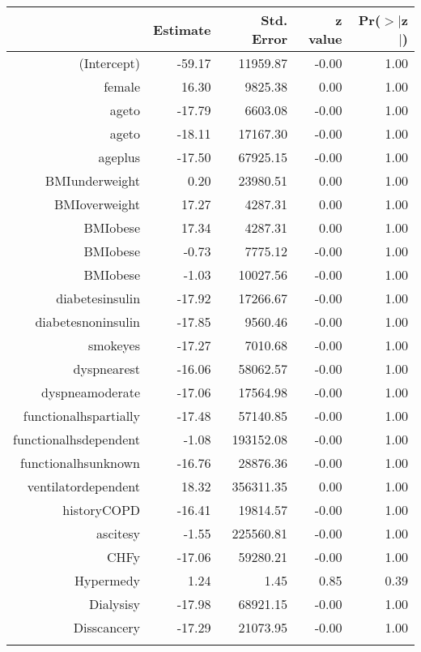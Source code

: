 \bigskip\bigskip
\centering
\begin{tabular}{rrrrr}
  \hline
 & Estimate & Std. Error & z value & Pr($>$$|$z$|$) \\ 
  \hline
(Intercept) & -59.17 & 11959.87 & -0.00 & 1.00 \\ 
  female & 16.30 & 9825.38 & 0.00 & 1.00 \\ 
  age\-65\-to\-74 & -17.79 & 6603.08 & -0.00 & 1.00 \\ 
  age\-75\-to\-84 & -18.11 & 17167.30 & -0.00 & 1.00 \\ 
  age\-85\-plus & -17.50 & 67925.15 & -0.00 & 1.00 \\ 
  BMI\-underweight & 0.20 & 23980.51 & 0.00 & 1.00 \\ 
  BMI\-overweight & 17.27 & 4287.31 & 0.00 & 1.00 \\ 
  BMI\-obese\-1 & 17.34 & 4287.31 & 0.00 & 1.00 \\ 
  BMI\-obese\-2 & -0.73 & 7775.12 & -0.00 & 1.00 \\ 
  BMI\-obese\-3 & -1.03 & 10027.56 & -0.00 & 1.00 \\ 
  diabetes\-insulin & -17.92 & 17266.67 & -0.00 & 1.00 \\ 
  diabetes\-noninsulin & -17.85 & 9560.46 & -0.00 & 1.00 \\ 
  smoke\-yes & -17.27 & 7010.68 & -0.00 & 1.00 \\ 
  dyspnea\-rest & -16.06 & 58062.57 & -0.00 & 1.00 \\ 
  dyspnea\-moderate & -17.06 & 17564.98 & -0.00 & 1.00 \\ 
  functional\-hs\-partially & -17.48 & 57140.85 & -0.00 & 1.00 \\ 
  functional\-hs\-dependent & -1.08 & 193152.08 & -0.00 & 1.00 \\ 
  functional\-hs\-unknown & -16.76 & 28876.36 & -0.00 & 1.00 \\ 
  ventilator\-dependent & 18.32 & 356311.35 & 0.00 & 1.00 \\ 
  history\-COPD & -16.41 & 19814.57 & -0.00 & 1.00 \\ 
  ascites\-y & -1.55 & 225560.81 & -0.00 & 1.00 \\ 
  CHF\-y & -17.06 & 59280.21 & -0.00 & 1.00 \\ 
  Hyper\-med\-y & 1.24 & 1.45 & 0.85 & 0.39 \\ 
  Dialysis\-y & -17.98 & 68921.15 & -0.00 & 1.00 \\ 
  Diss\-cancer\-y & -17.29 & 21073.95 & -0.00 & 1.00 \\ 
$$
\end{tabular}
